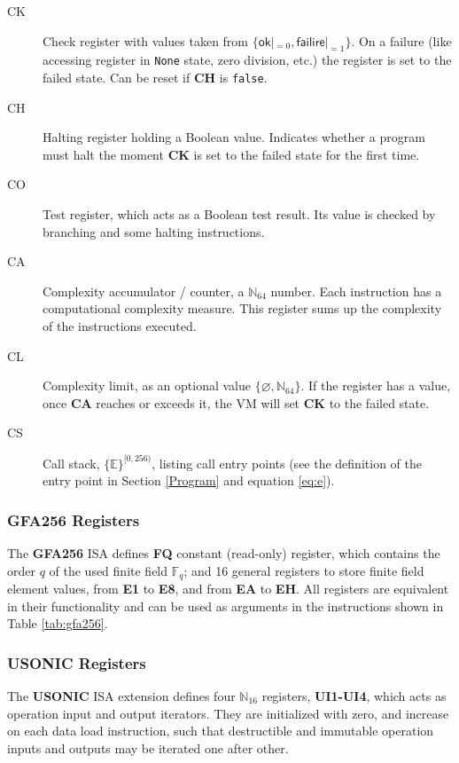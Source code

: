 \documentclass[9pt,oneside]{amsart}
\begin{document}
\begin{multicols}{2}
\begin{description}
\item[CK] Check register with values taken from $\{\mathsf{ok}|_{=0}, \mathsf{failire}|_{=1}\}$.
    On a failure (like accessing register in \texttt{None} state, zero division, etc.)
    the register is set to the failed state.
    Can be reset if \textbf{CH} is \texttt{false}.
\item[CH] Halting register holding a Boolean value.
    Indicates whether a program must halt the moment \textbf{CK}
    is set to the failed state for the first time.
\item[CO] Test register, which acts as a Boolean test result.
    Its value is checked by branching and some halting instructions.
\item[CA] Complexity accumulator / counter, a $\mathbb{N}_{64}$ number.
    Each instruction has a computational complexity measure.
    This register sums up the complexity of the instructions executed.
\item[CL] Complexity limit, as an optional value $\{\varnothing, \mathbb{N}_{64}\}$.
    If the register has a value, once \textbf{CA} reaches or exceeds it,
    the VM will set \textbf{CK} to the failed state.
\item[CS] Call stack, $\{ \mathbb{E} \}^{[0, 256)}$, listing call entry points
    (see the definition of the entry point in Section \ref{Program} and equation \ref{eq:e}).
\end{description}

\subsubsection{\textbf{GFA256} Registers}

The \textbf{GFA256} ISA defines \textbf{FQ} constant (read-only) register,
which contains the order $q$ of the used finite field $\mathbb{F}_q$; and
16 general registers to store finite field element values,
from \textbf{E1} to \textbf{E8}, and from \textbf{EA} to \textbf{EH}.
All registers are equivalent in their functionality and can be used
as arguments in the instructions shown in Table \ref{tab:gfa256}.

\subsubsection{\textbf{USONIC} Registers}

The \textbf{USONIC} ISA extension defines four $\mathbb{N}_{16}$ registers,
\textbf{UI1-UI4}, which acts as operation input and output iterators.
They are initialized with zero, and increase on each data load instruction,
such that destructible and immutable operation inputs and outputs may be
iterated one after other.


\end{multicols}
\end{document}
